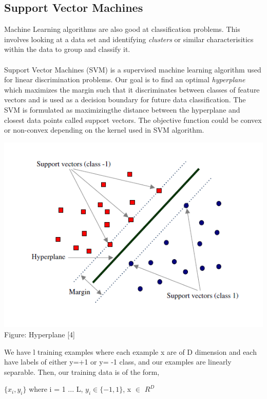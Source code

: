 \documentclass[hidelinks,11pt]{article}
\begin{document}
\subsection{Support Vector Machines}
	Machine Learning algorithms are also good at classification problems. This involves looking at a data set and identifying \textit{clusters} or similar characterisitics within the data to group and classify it.
	\paragraph{}
	Support Vector Machines (SVM) is a supervised machine learning algorithm used for linear discrimination problems. Our goal is to find an optimal \textit{hyperplane} which maximizes the margin such that it discriminates between classes of feature vectors and is used as a decision boundary for future data classification. The SVM is formulated as maximizingthe distance between the hyperplane and closest data points called support vectors. The objective function could be convex or non-convex depending on the kernel used in SVM algorithm.\cite {BOOK:1}

	\begin{center}
	    \includegraphics[scale = 0.7]{images/hyperplane.png}
	    Figure: Hyperplane [4]
	\end{center}

	We have l training examples where each example x are of D dimension and each have labels of either y=+1 or y= -1 class, and our examples are linearly separable. Then, our training data is of the form,
	\begin{center}
	    $\{x_i,y_i\}$ where i = 1 ... L, $y_i \in \{-1,1\}$, x $\in$ $R^D$ 
	\end{center}
\end{document}
